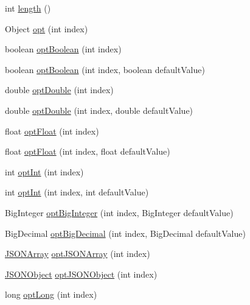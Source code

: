 \begin{DoxyCompactItemize}
\item 
int \hyperlink{classorg_1_1json_1_1JSONArray_a8382a78090007f650a02895ecbf3c8ec}{length} ()
\item 
Object \hyperlink{classorg_1_1json_1_1JSONArray_a19aa83c80cded3d0a252c212ceca7954}{opt} (int index)
\item 
boolean \hyperlink{classorg_1_1json_1_1JSONArray_a157f9232dea069ba4d201d1eba431084}{opt\-Boolean} (int index)
\item 
boolean \hyperlink{classorg_1_1json_1_1JSONArray_adf119f56ddd47c4b9703f44efac4c3ef}{opt\-Boolean} (int index, boolean default\-Value)
\item 
double \hyperlink{classorg_1_1json_1_1JSONArray_ae1cb586b1d073252a0ac07b6965f7a08}{opt\-Double} (int index)
\item 
double \hyperlink{classorg_1_1json_1_1JSONArray_a0e12afede9c6e7be4ca467ce48171d17}{opt\-Double} (int index, double default\-Value)
\item 
float \hyperlink{classorg_1_1json_1_1JSONArray_aa962b2093432ea13c1ea56e247b40dee}{opt\-Float} (int index)
\item 
float \hyperlink{classorg_1_1json_1_1JSONArray_aeddbb8446df12476c6d81745bbe171b9}{opt\-Float} (int index, float default\-Value)
\item 
int \hyperlink{classorg_1_1json_1_1JSONArray_a10c76bdd9ef243702d62c0c92ea803fc}{opt\-Int} (int index)
\item 
int \hyperlink{classorg_1_1json_1_1JSONArray_a820390cf8f7846a2363c59119e303a2d}{opt\-Int} (int index, int default\-Value)
\item 
Big\-Integer \hyperlink{classorg_1_1json_1_1JSONArray_a1a2020defcc86992a3cea8397d225f7b}{opt\-Big\-Integer} (int index, Big\-Integer default\-Value)
\item 
Big\-Decimal \hyperlink{classorg_1_1json_1_1JSONArray_a692453261daedf7500878198e0a1938c}{opt\-Big\-Decimal} (int index, Big\-Decimal default\-Value)
\item 
\hyperlink{classorg_1_1json_1_1JSONArray}{J\-S\-O\-N\-Array} \hyperlink{classorg_1_1json_1_1JSONArray_af73e0318cfde76d4ade3cfc1bb99e325}{opt\-J\-S\-O\-N\-Array} (int index)
\item 
\hyperlink{classorg_1_1json_1_1JSONObject}{J\-S\-O\-N\-Object} \hyperlink{classorg_1_1json_1_1JSONArray_a21bcc36e0e4ce0f4659497db27d7081d}{opt\-J\-S\-O\-N\-Object} (int index)
\item 
long \hyperlink{classorg_1_1json_1_1JSONArray_af38b848063c07f2a3218592bb595e722}{opt\-Long} (int index)
\item 

\end{DoxyCompactItemize}
